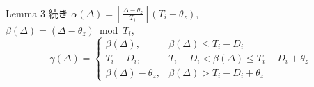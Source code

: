 \begin{frame}{Lemma 3 続き}
    \centering$\alpha(\Delta)=\left\lfloor\frac{\Delta-\theta_{z}}{T_{i}}\right\rfloor\left(T_{i}-\theta_{z}\right)$,\\
    \centering$\beta(\Delta)=\left(\Delta-\theta_{z}\right) \bmod T_{i}$,
    \begin{equation*}
        \gamma(\Delta)=\left\{\begin{array}{lr}
            \beta(\Delta),            & \beta(\Delta) \leq T_{i}-D_{i}                        \\
            T_{i}-D_{i},              & T_{i}-D_{i}<\beta(\Delta) \leq T_{i}-D_{i}+\theta_{z} \\
            \beta(\Delta)-\theta_{z}, & \beta(\Delta)>T_{i}-D_{i}+\theta_{z}
        \end{array}\right.
    \end{equation*}
\end{frame}


